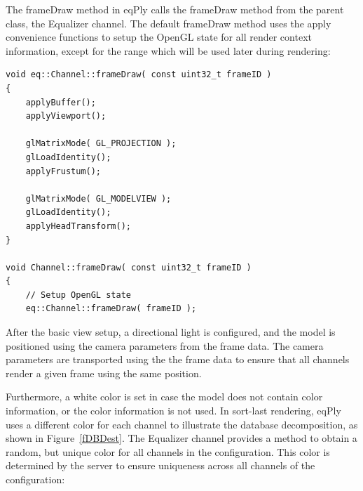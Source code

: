 \documentclass[10pt,a4]{scrartcl}
\newcommand{\fig}[1]{Figure~\ref{#1}}
\begin{document}
The \textsf{frameDraw} method in \textsf{eqPly} calls the
\textsf{frameDraw} method from the parent class, the Equalizer
channel. The default \textsf{frameDraw} method uses the apply
convenience functions to setup the OpenGL state for all render context
information, except for the range which will be used later during
rendering:

{\footnotesize\begin{lstlisting}
void eq::Channel::frameDraw( const uint32_t frameID )
{
    applyBuffer();
    applyViewport();
    
    glMatrixMode( GL_PROJECTION );
    glLoadIdentity();
    applyFrustum();

    glMatrixMode( GL_MODELVIEW );
    glLoadIdentity();
    applyHeadTransform();
}

void Channel::frameDraw( const uint32_t frameID )
{
    // Setup OpenGL state
    eq::Channel::frameDraw( frameID );
\end{lstlisting}}

After the basic view setup, a directional light is configured, and the
model is positioned using the camera parameters from the frame data. The
camera parameters are transported using the the frame data to ensure
that all channels render a given frame using the same position.

Furthermore, a white color is set in case the model does not contain
color information, or the color information is not used. In sort-last
rendering, \textsf{eqPly} uses a different color for each channel to
illustrate the database decomposition, as shown in \fig{fDBDest}. The
Equalizer channel provides a method to obtain a random, but unique color
for all channels in the configuration. This color is determined by the
server to ensure uniqueness across all channels of the configuration:
\end{document}
